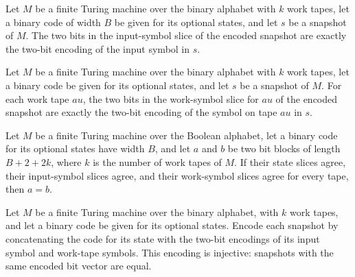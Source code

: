 \begin{lemma}
\label{Complexity.clBlock_input}
\leanok
{}
Let $M$ be a finite Turing machine over the binary alphabet with $k$ work tapes, let a
binary code of width $B$ be given for its optional states, and let $s$ be a snapshot of
$M$. The two bits in the input-symbol slice of the encoded snapshot are exactly the
two-bit encoding of the input symbol in $s$.
\end{lemma}

\begin{lemma}
\label{Complexity.clBlock_work}
\leanok
{}
Let $M$ be a finite Turing machine over the binary alphabet with $k$ work tapes, let a
binary code be given for its optional states, and let $s$ be a snapshot of $M$. For each
work tape $	au$, the two bits in the work-symbol slice for $	au$ of the encoded snapshot
are exactly the two-bit encoding of the symbol on tape $	au$ in $s$.
\end{lemma}

\begin{lemma}
\label{Complexity.clBlock_ext}
\leanok
{}
Let $M$ be a finite Turing machine over the Boolean alphabet, let a binary code for its
optional states have width $B$, and let $a$ and $b$ be two bit blocks of length
$B+2+2k$, where $k$ is the number of work tapes of $M$. If their state slices agree,
their input-symbol slices agree, and their work-symbol slices agree for every tape, then
$a=b$.
\end{lemma}

\begin{lemma}
\label{Complexity.clBlock_injective}
\leanok
{}
Let $M$ be a finite Turing machine over the binary alphabet, with $k$ work tapes, and
let a binary code be given for its optional states. Encode each snapshot by
concatenating the code for its state with the two-bit encodings of its input symbol and
work-tape symbols. This encoding is injective: snapshots with the same encoded bit
vector are equal.
\end{lemma}

